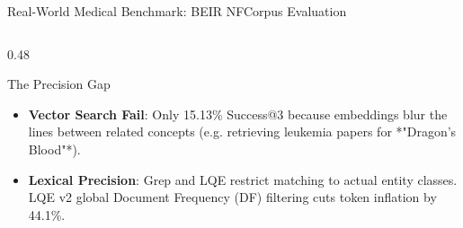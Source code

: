 \documentclass[aspectratio=169]{beamer}
\begin{document}
\begin{frame}{Real-World Medical Benchmark: BEIR NFCorpus Evaluation}
    \begin{columns}[T]
        \begin{column}{0.48\textwidth}
            \begin{block}{The Precision Gap}
                \small
                \begin{itemize}
                    \item \textbf{Vector Search Fail}: Only 15.13\% Success@3 because embeddings blur the lines between related concepts (e.g. retrieving leukemia papers for *"Dragon's Blood"*).
                    \item \textbf{Lexical Precision}: Grep and LQE restrict matching to actual entity classes. LQE v2 global Document Frequency (DF) filtering cuts token inflation by 44.1\%.
                \end{itemize}
            \end{block}
        \end{column}
    \end{columns}
\end{frame}
\end{document}
